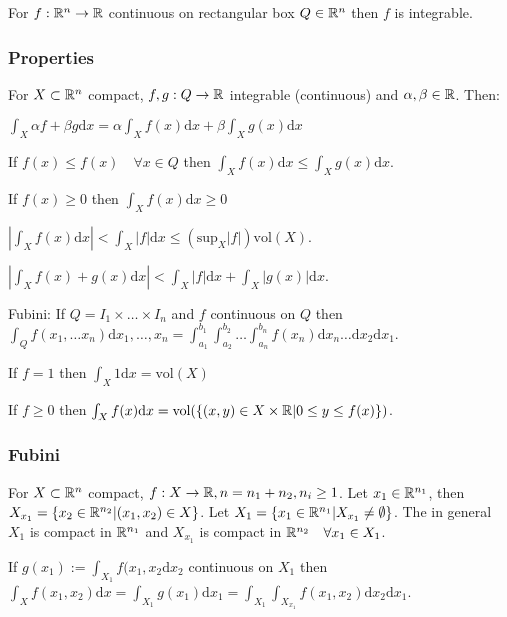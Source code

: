 For $f: \mathbb{R}^n \to \mathbb{R}$ continuous on rectangular box $Q \in \mathbb{R}^n$ then $f$ is integrable.

\subsubsection{Properties}
For $X \subset \mathbb{R}^n$ compact, $f, g: Q \to \mathbb{R}$ integrable (continuous) and $\alpha, \beta \in \mathbb{R}$. Then:

\begin{compactitem}
    \item $\int_X \alpha f + \beta g \mathrm{d}x = \alpha \int_X f(x) \mathrm{d}x + \beta \int_X g(x) \mathrm{d}x$
    \item If $f(x) \le f(x) \quad \forall x \in Q$ then $\int_X f(x) \mathrm{d}x \le \int_X g(x) \mathrm{d}x$.
    \item If $f(x) \ge 0$ then $\int_X f(x) \mathrm{d}x \ge 0$
    \item $\left| \int_X f(x) \mathrm{d}x \right| < \int_X |f| \mathrm{d}x \le (\text{sup}_X |f|) \text{vol}(X)$.
    \item $\left| \int_X f(x) + g(x) \mathrm{d}x \right| < \int_X |f| \mathrm{d}x + \int_X | g(x) | \mathrm{d}x$.
    \item Fubini: If $Q = I_1 \times \dots \times I_n$ and $f$ continuous on $Q$ then $\int_{Q} f(x_1, \dots x_n) \mathrm{d}x_1,\dots,x_n = \int_{a_1}^{b_1} \int_{a_2}^{b_2} \dots \int_{a_n}^{b_n} f(x_n) \mathrm{d}x_n \dots \mathrm{d}x_2 \mathrm{d}x_1$.
    \item If $f = 1$ then $\int_X 1 \mathrm{d}x = \text{vol}(X)$
    \item If $f \ge 0$ then $\int_X f(x) \mathrm{d}x = \text{vol}(\{(x, y) \in X \times \mathbb{R} | 0 \le y \le f(x) \})$.
\end{compactitem}

\subsubsection{Fubini}
For $X \subset \mathbb{R}^n$ compact, $f: X \to \mathbb{R}, n = n_1 + n_2, n_i \ge 1$. Let $x_1 \in \mathbb{R}^{n_1}$, then $X_{x_1} = \{x_2 \in \mathbb{R}^{n_2} | (x_1, x_2) \in X\}$. Let $X_1 = \{x_1 \in \mathbb{R}^{n_1} | X_{x_1} \neq \emptyset \}$. The in general $X_1$ is compact in $\mathbb{R}^{n_1}$ and $X_{x_1}$ is compact in $\mathbb{R}^{n_2} \quad \forall x_1 \in X_1$.

If $g(x_1) := \int_{X_1} f(x_1, x_2 \mathrm{d}x_2$ continuous on $X_1$ then $\int_X f(x_1, x_2) \mathrm{d}x = \int_{X_1} g(x_1) \mathrm{d}x_1 = \int_{X_1} \int_{X_{x_1}} f(x_1, x_2) \mathrm{d}x_2 \mathrm{d}x_1$.

